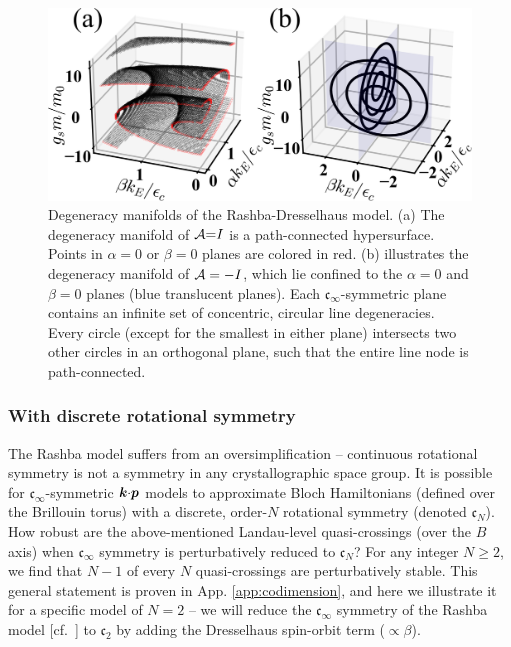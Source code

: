 \documentclass[aps, prb, showpacs, twocolumn, notitlepage, superscriptaddress]{revtex4-1}
\begin{document}
\begin{figure}
\includegraphics[width=1.0\columnwidth]{dgn.png}
\caption{Degeneracy manifolds of the Rashba-Dresselhaus model. (a) The degeneracy manifold of ${\cal A}{=}I$ is a path-connected hypersurface. Points in $\alpha=0$ or $\beta=0$ planes are colored in red. (b) illustrates the degeneracy manifold of ${\cal A}=-I$, which lie confined to  the $\alpha{=}0$ and $\beta{=}0$ planes (blue translucent planes). Each $\mathfrak{c}_{\infty}$-symmetric plane contains an infinite set of concentric, circular line degeneracies. Every circle (except for the smallest in either plane)  intersects two other circles in an orthogonal plane, such that the entire line node is path-connected. \label{fig:dgn}}
\end{figure}

\subsubsection{With discrete rotational symmetry}\label{sec:disrot}


The Rashba model suffers from an oversimplification -- continuous rotational symmetry is not a symmetry in any crystallographic space group. It is possible for $\mathfrak{c}_{\infty}$-symmetric $\boldsymbol{k}{\cdot}\boldsymbol{p}$ models to approximate Bloch Hamiltonians (defined over the Brillouin torus) with a discrete, order-$N$ rotational symmetry (denoted $\mathfrak{c}_N$). How robust are the above-mentioned Landau-level quasi-crossings  (over the $B$ axis) when $\mathfrak{c}_{\infty}$ symmetry is perturbatively reduced to $\mathfrak{c}_N$? For any  integer $N{\geq}2$, we find that $N{-}1$ of every $N$ quasi-crossings  are perturbatively stable. This general statement is proven in App. \ref{app:codimension}, and here we illustrate it for a specific model of $N{=}2$ -- we will reduce the $\mathfrak{c}_{\infty}$ symmetry of the Rashba model [cf.\ ] to  $\mathfrak{c}_2$  by adding the Dresselhaus spin-orbit term (${\propto} \beta$).  
\end{document}
